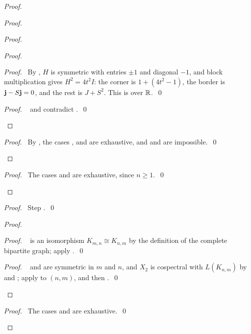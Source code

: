 \begin{proof}
\begin{proof}
\begin{proof}
\begin{proof}
    \begin{proof}\pf\ By , $H$ is symmetric with entries $\pm1$ and diagonal
     $-1$, and block multiplication gives $H^2=4t^2I$: the corner is $1+(4t^2-1)$, the border
     is ${\mathbf j}-S{\mathbf j}=0$, and the rest is $J+S^2$. This is  over
     ${\mathbb R}$.~\qed\end{proof}
    \qedstep
    \begin{proof}\pf\  and  contradict .~\qed\end{proof}
   \end{proof}
   \qedstep
   \begin{proof}\pf\ By , the cases ,  and
     are exhaustive, and  and  are
    impossible.~\qed\end{proof}
  \end{proof}
  \qedstep
  \begin{proof}\pf\ The cases  and  are exhaustive, since
   $n\ge1$.~\qed\end{proof}
 \end{proof}
 \begin{proof}\pf\ Step .~\qed\end{proof}
 \begin{proof}
  \begin{proof}\pf\  is an isomorphism $K_{m,n}\cong K_{n,m}$ by the
   definition of the complete bipartite graph; apply .~\qed\end{proof}
  \qedstep
  \begin{proof}\pf\  and  are symmetric in $m$ and $n$, and $X_2$ is
   cospectral with $L(K_{n,m})$ by  and ; apply
    to $(n,m)$, and then .~\qed\end{proof}
 \end{proof}
 \qedstep
 \begin{proof}\pf\ The cases  and  are exhaustive.~\qed\end{proof}
\end{proof}

